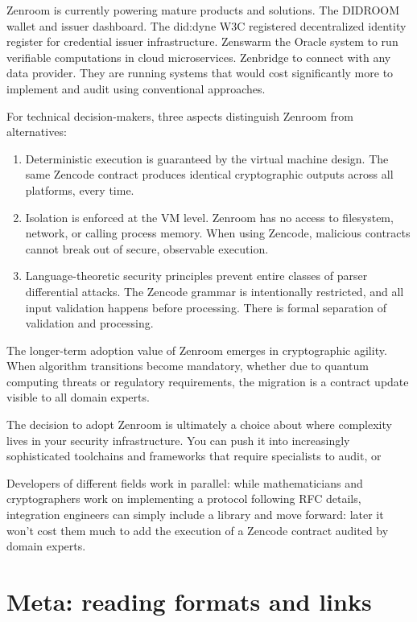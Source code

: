Zenroom is currently powering mature products and solutions. The
DIDROOM wallet and issuer dashboard. The did:dyne W3C registered
decentralized identity register for credential issuer infrastructure.
Zenswarm the Oracle system to run verifiable computations in cloud
microservices. Zenbridge to connect with any data provider. They are
running systems that would cost significantly more to implement and
audit using conventional approaches.

For technical decision-makers, three aspects distinguish Zenroom from
alternatives:

\begin{enumerate}
\item Deterministic execution is guaranteed by the virtual machine
  design. The same Zencode contract produces identical cryptographic
  outputs across all platforms, every time.

\item Isolation is enforced at the VM level. Zenroom has no access to
  filesystem, network, or calling process memory. When using Zencode,
  malicious contracts cannot break out of secure, observable execution.

\item Language-theoretic security principles prevent entire classes of
  parser differential attacks. The Zencode grammar is intentionally
  restricted, and all input validation happens before
  processing. There is formal separation of validation and processing.
\end{enumerate}

The longer-term adoption value of Zenroom emerges in cryptographic
agility. When algorithm transitions become mandatory, whether due to
quantum computing threats or regulatory requirements, the migration is
a contract update visible to all domain experts.

The decision to adopt Zenroom is ultimately a choice about where
complexity lives in your security infrastructure. You can push it into
increasingly sophisticated toolchains and frameworks that require
specialists to audit, or

Developers of different fields work in parallel: while mathematicians
and cryptographers work on implementing a protocol following RFC
details, integration engineers can simply include a library and move
forward: later it won't cost them much to add the execution of a
Zencode contract audited by domain experts.

\section{Meta: reading formats and links}

